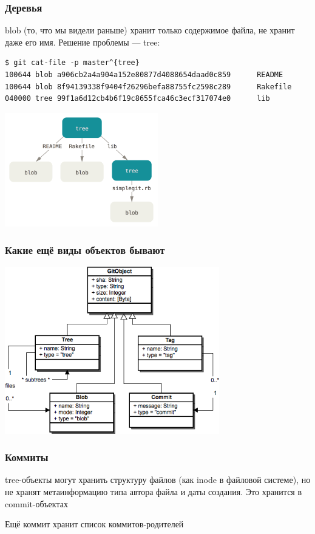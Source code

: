 \documentclass[xetex,mathserif,serif]{beamer}
\begin{document}
	\begin{frame}[fragile]
		\frametitle{Деревья}
		blob (то, что мы видели раньше) хранит только содержимое файла, не хранит даже его имя. Решение проблемы --- tree:
		\begin{scriptsize}
		\begin{verbatim}
$ git cat-file -p master^{tree}
100644 blob a906cb2a4a904a152e80877d4088654daad0c859      README
100644 blob 8f94139338f9404f26296befa88755fc2598c289      Rakefile
040000 tree 99f1a6d12cb4b6f19c8655fca46c3ecf317074e0      lib
		\end{verbatim}
		\end{scriptsize}
		\begin{center}
			\includegraphics[width=0.5\textwidth]{gitTreeObject.png}
		\end{center}
	\end{frame}

	\begin{frame}
		\frametitle{Какие ещё виды объектов бывают}
		\begin{center}
			\includegraphics[width=0.7\textwidth]{gitDataStructure.png}
		\end{center}
	\end{frame}

	\begin{frame}[fragile]
		\frametitle{Коммиты}
		tree-объекты могут хранить структуру файлов (как inode в файловой системе), но не хранят метаинформацию типа автора файла и даты создания. Это хранится в commit-объектах
		
		\vspace{1cm}
		Ещё коммит хранит список коммитов-родителей
	\end{frame}
\end{document}
